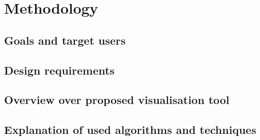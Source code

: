 %
\chapter{Methodology}
\label{sec:method}

\section{Goals and target users}
\label{sec:method:goals}

\section{Design requirements}
\label{sec:method:requirements}

\section{Overview over proposed visualisation tool}
\label{sec:method:overview}

\section{Explanation of used algorithms and techniques}
\label{sec:method:explain}